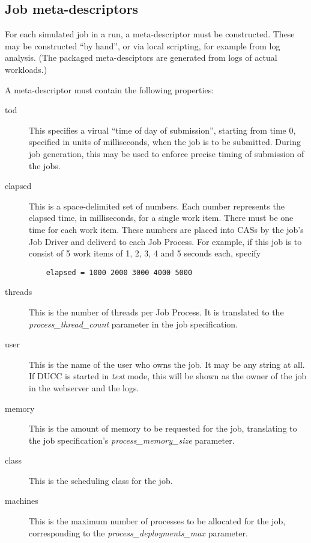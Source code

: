      \subsection{Job meta-descriptors}
     For each simulated job in a run, a meta-descriptor must be constructed.  These may be
     constructed ``by hand'', or via local scripting, for example from log analysis.  (The
     packaged meta-desciptors are generated from logs of actual workloads.)

     A meta-descriptor must contain the following properties:
     \begin{description}
       \item[tod] This specifies a virual ``time of day of submission'', starting from time 0, specified
         in units of milliseconds, when the job is to be submitted.  During job generation, this may
         be used to enforce precise timing of submission of the jobs.
       \item[elapsed] This is a space-delimited set of numbers.  Each number represents the elapsed time,
         in milliseconds, for a single work item.  There must be one time for each work item.  
         These numbers are placed into CASs by the job's Job Driver and deliverd to each Job Process.
         For example,
         if this job is to consist of 5 work items of 1, 2, 3, 4 and 5 seconds each, specify
\begin{verbatim}
    elapsed = 1000 2000 3000 4000 5000
\end{verbatim}
       \item[threads] This is the number of threads per Job Process.  It is translated to the
         {\em process\_thread\_count} parameter in the job specification.
       \item[user] This is the name of the user who owns the job.  It may be any string at
         all.  If DUCC is started in {\em test} mode, this will be shown as the owner of 
         the job in the webserver and the logs.
       \item[memory] This is the amount of memory to be requested for the job, translating
         to the job specification's {\em process\_memory\_size} parameter.
       \item[class] This is the scheduling class for the job.
       \item[machines] This is the maximum number of processes to be allocated for the
         job, corresponding to the {\em process\_deployments\_max} parameter.
       \end{description}
       

